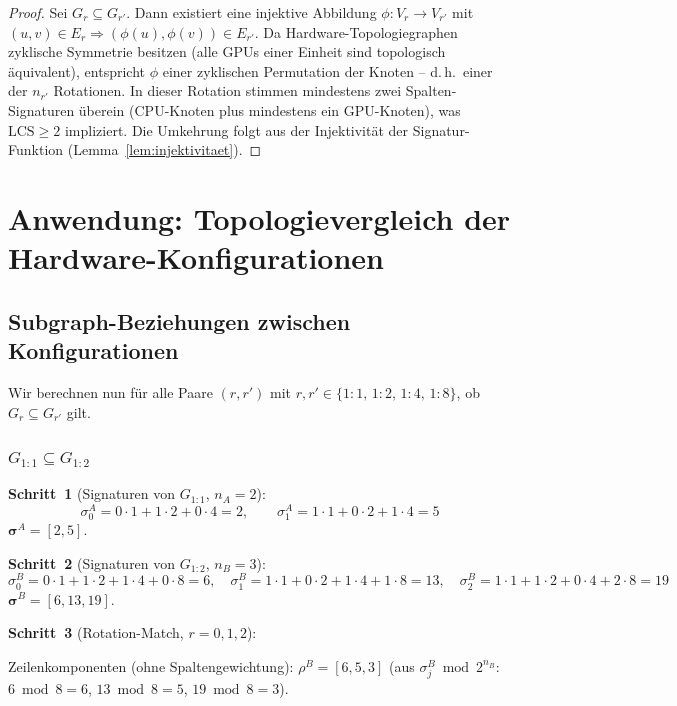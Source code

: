 ﻿\documentclass[a4paper,12pt]{article}
\theoremstyle{definition}
\begin{document}
\begin{proof}
  Sei $G_r \subseteq G_{r'}$. Dann existiert eine injektive Abbildung
  $\phi: V_r \to V_{r'}$ mit $(u,v)\in E_r \Rightarrow (\phi(u),\phi(v))\in E_{r'}$.
  Da Hardware-Topologiegraphen zyklische Symmetrie besitzen
  (alle GPUs einer Einheit sind topologisch \"aquivalent), entspricht $\phi$ einer
  zyklischen Permutation der Knoten -- d.\,h.\ einer der $n_{r'}$ Rotationen.
  In dieser Rotation stimmen mindestens zwei Spalten-Signaturen \"uberein
  (CPU-Knoten plus mindestens ein GPU-Knoten), was $\mathrm{LCS} \geq 2$ impliziert.
  Die Umkehrung folgt aus der Injektivit\"at der Signatur-Funktion (Lemma~\ref{lem:injektivitaet}). \qedhere
\end{proof}

\section{Anwendung: Topologievergleich der Hardware-Konfigurationen}

\subsection{Subgraph-Beziehungen zwischen Konfigurationen}

Wir berechnen nun f\"ur alle Paare $(r, r')$ mit
$r, r' \in \{1:1,\,1:2,\,1:4,\,1:8\}$, ob $G_r \subseteq G_{r'}$ gilt.

\subsubsection{$G_{1:1} \subseteq G_{1:2}$}

\textbf{Schritt~1} (Signaturen von $G_{1:1}$, $n_A = 2$):
\[
  \sigma_0^A = 0\cdot1 + 1\cdot2 + 0\cdot4 = 2, \qquad
  \sigma_1^A = 1\cdot1 + 0\cdot2 + 1\cdot4 = 5
\]
$\boldsymbol{\sigma}^A = [2, 5]$.

\textbf{Schritt~2} (Signaturen von $G_{1:2}$, $n_B = 3$):
\[
  \sigma_0^B = 0\cdot1+1\cdot2+1\cdot4+0\cdot8 = 6, \quad
  \sigma_1^B = 1\cdot1+0\cdot2+1\cdot4+1\cdot8 = 13, \quad
  \sigma_2^B = 1\cdot1+1\cdot2+0\cdot4+2\cdot8 = 19
\]
$\boldsymbol{\sigma}^B = [6, 13, 19]$.

\textbf{Schritt~3} (Rotation-Match, $r=0,1,2$):

Zeilenkomponenten (ohne Spaltengewichtung):
$\rho^B = [6, 5, 3]$
(aus $\sigma_j^B \bmod 2^{n_B}$: $6\bmod8=6$, $13\bmod8=5$, $19\bmod8=3$).
\end{document}
